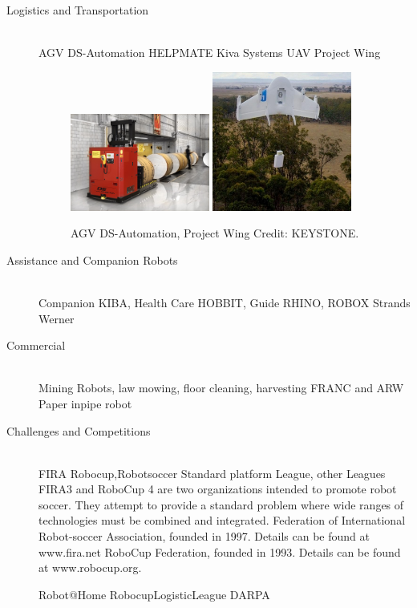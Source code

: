 \begin{description}
\item[Logistics and Transportation]\hfill \\
AGV DS-Automation
HELPMATE
Kiva Systems \cite{kiva}
UAV Project Wing
\begin{figure}[thpb]
	  \myfloatalign
      \footnotesize
      \centering
    \subfloat
    {  \label{fig:fig_agv}
        \includegraphics[width=0.45\textwidth,height=0.2\textheight]{figures/fig_AGV-dsautomation.jpg}
    }
    \subfloat
    {  \label{fig:fig_uav}
        \includegraphics[width=0.45\textwidth,height=0.2\textheight]{figures/fig_wing.jpg}
    }     
   \caption[Logistic robots]{AGV DS-Automation, Project Wing Credit: KEYSTONE.}
   \label{fig:fig_rescue}
\end{figure}


\item[Assistance and Companion Robots]\hfill \\
Companion KIBA, 
Health Care HOBBIT, 
Guide RHINO, ROBOX
Strands Werner

\item[Commercial]\hfill \\
Mining Robots, law mowing, floor cleaning, harvesting
FRANC and ARW Paper
inpipe robot \cite{mateos2013inpipe}

\item[Challenges and Competitions]\hfill \\
FIRA
Robocup,Robotsoccer Standard platform League, other Leagues
FIRA3 and RoboCup 4 are two organizations intended to promote robot soccer. They
attempt to provide a standard problem where wide ranges of technologies must be combined
and integrated.
Federation of International Robot-soccer Association, founded in 1997. Details can be found at www.fira.net
RoboCup Federation, founded in 1993. Details can be found at www.robocup.org.

Robot@Home
RobocupLogisticLeague
DARPA

\end{description}

